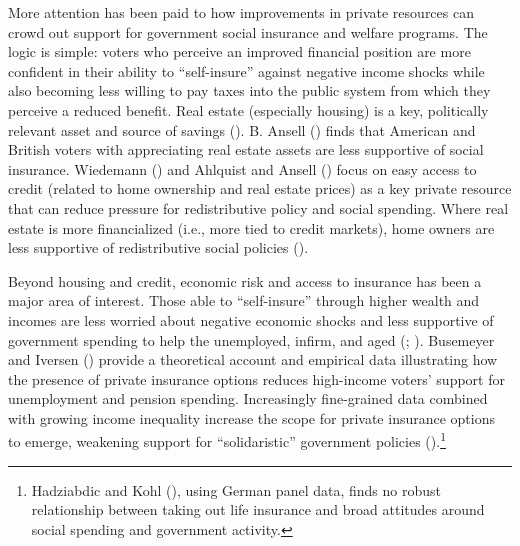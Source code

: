 \documentclass[
  11pt,
  oneside]{article}
\begin{document}
More attention has been paid to how improvements in private resources can crowd out support for government social insurance and welfare programs. The logic is simple: voters who perceive an improved financial position are more confident in their ability to ``self-insure'' against negative income shocks while also becoming less willing to pay taxes into the public system from which they perceive a reduced benefit. Real estate (especially housing) is a key, politically relevant asset and source of savings (). B. Ansell () finds that American and British voters with appreciating real estate assets are less supportive of social insurance. Wiedemann () and Ahlquist and Ansell () focus on easy access to credit (related to home ownership and real estate prices) as a key private resource that can reduce pressure for redistributive policy and social spending. Where real estate is more financialized (i.e., more tied to credit markets), home owners are less supportive of redistributive social policies ().

Beyond housing and credit, economic risk and access to insurance has been a major area of interest. Those able to ``self-insure'' through higher wealth and incomes are less worried about negative economic shocks and less supportive of government spending to help the unemployed, infirm, and aged (; ). Busemeyer and Iversen () provide a theoretical account and empirical data illustrating how the presence of private insurance options reduces high-income voters' support for unemployment and pension spending. Increasingly fine-grained data combined with growing income inequality increase the scope for private insurance options to emerge, weakening support for ``solidaristic'' government policies ().\footnote{Hadziabdic and Kohl (), using German panel data, finds no robust relationship between taking out life insurance and broad attitudes around social spending and government activity.}
\end{document}

